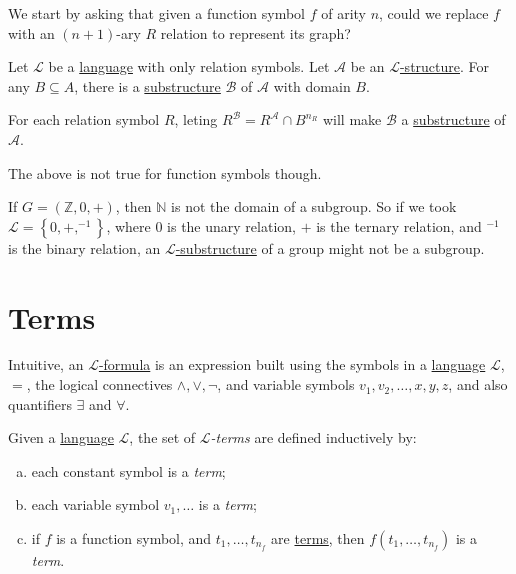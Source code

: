 We start by asking that given a function symbol \(f\) of arity \(n\), could we replace \(f\) with an \((n+1)\)-ary \(R\) relation to represent its graph?

\begin{eg}
	Let \(\mathcal{L} \) be a \hyperref[def:language]{language} with only relation symbols. Let \(\mathcal{A} \) be an \hyperref[def:structure]{\(\mathcal{L} \)-structure}. For any \(B \subseteq A\), there is a \hyperref[def:substructure]{substructure} \(\mathcal{B} \) of \(\mathcal{A} \) with domain \(B\).
\end{eg}
\begin{explanation}
	For each relation symbol \(R\), leting \(R^{\mathcal{B} } =R^{\mathcal{A} }  \cap B^{n_R}\) will make \(\mathcal{B} \) a \hyperref[def:substructure]{substructure} of \(\mathcal{A} \).
\end{explanation}

The above is not true for function symbols though.

\begin{eg}
	If \(G=(\mathbb{Z} , 0, +)\), then \(\mathbb{N} \) is not the domain of a subgroup. So if we took \(\mathcal{L} =\left\{ 0, +, ^{-1}  \right\} \), where \(0\) is the unary relation, \(+\) is the ternary relation, and \(^{-1} \) is the binary relation, an \hyperref[def:substructure]{\(\mathcal{L} \)-substructure} of a group might not be a subgroup.
\end{eg}

\section{Terms}
Intuitive, an \hyperref[def:formula]{\(\mathcal{L} \)-formula} is an expression built using the symbols in a \hyperref[def:language]{language} \(\mathcal{L} \), \(=\), the logical connectives \(\land, \lor, \lnot\), and variable symbols \(v_1, v_2, \ldots , x, y, z\), and also quantifiers \(\exists \) and \(\forall \).

\begin{definition}[Term]\label{def:term}
	Given a \hyperref[def:language]{language} \(\mathcal{L} \), the set of \emph{\(\mathcal{L} \)-terms} are defined inductively by:
	\begin{enumerate}[(a)]
		\item each constant symbol is a \emph{term};
		\item each variable symbol \(v_1, \ldots \) is a \emph{term};
		\item if \(f\) is a function symbol, and \(t_1, \ldots , t_{n_f}\) are \hyperref[def:term]{terms}, then \(f(t_1, \ldots , t_{n_f})\) is a \emph{term}.
	\end{enumerate}
\end{definition}

